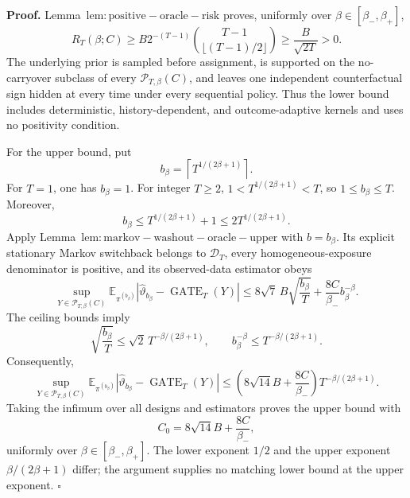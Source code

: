 \textbf{Proof.} Lemma~\(\mathrm{lem:positive-oracle-risk}\) proves, uniformly over \(\beta\in[\beta_-,\beta_+]\),
\[
R_T(\beta;C)\ge B2^{-(T-1)}\binom{T-1}{\lfloor(T-1)/2\rfloor}\ge\frac{B}{\sqrt{2T}}>0.
\]
The underlying prior is sampled before assignment, is supported on the no-carryover subclass of every \(\mathcal P_{T,\beta}(C)\), and leaves one independent counterfactual sign hidden at every time under every sequential policy. Thus the lower bound includes deterministic, history-dependent, and outcome-adaptive kernels and uses no positivity condition.

For the upper bound, put
\[
b_\beta=\left\lceil T^{1/(2\beta+1)}\right\rceil.
\]
For \(T=1\), one has \(b_\beta=1\). For integer \(T\ge2\), \(1<T^{1/(2\beta+1)}<T\), so \(1\le b_\beta\le T\). Moreover,
\[
b_\beta\le T^{1/(2\beta+1)}+1\le2T^{1/(2\beta+1)}.
\]
Apply Lemma~\(\mathrm{lem:markov-washout-oracle-upper}\) with \(b=b_\beta\). Its explicit stationary Markov switchback belongs to \(\mathcal D_T\), every homogeneous-exposure denominator is positive, and its observed-data estimator obeys
\[
\sup_{Y\in\mathcal P_{T,\beta}(C)}
\mathbb E_{\pi^{(b_\beta)}}\left\lvert\widehat\vartheta_{b_\beta}-\operatorname{GATE}_T(Y)\right\rvert
\le8\sqrt7\,B\sqrt{\frac{b_\beta}{T}}+\frac{8C}{\beta_-}b_\beta^{-\beta}.
\]
The ceiling bounds imply
\[
\sqrt{\frac{b_\beta}{T}}\le\sqrt2\,T^{-\beta/(2\beta+1)},
\qquad
b_\beta^{-\beta}\le T^{-\beta/(2\beta+1)}.
\]
Consequently,
\[
\sup_{Y\in\mathcal P_{T,\beta}(C)}
\mathbb E_{\pi^{(b_\beta)}}\left\lvert\widehat\vartheta_{b_\beta}-\operatorname{GATE}_T(Y)\right\rvert
\le\left(8\sqrt{14}B+\frac{8C}{\beta_-}\right)T^{-\beta/(2\beta+1)}.
\]
Taking the infimum over all designs and estimators proves the upper bound with
\[
C_0=8\sqrt{14}B+\frac{8C}{\beta_-},
\]
uniformly over \(\beta\in[\beta_-,\beta_+]\). The lower exponent \(1/2\) and the upper exponent \(\beta/(2\beta+1)\) differ; the argument supplies no matching lower bound at the upper exponent. \(\square\)